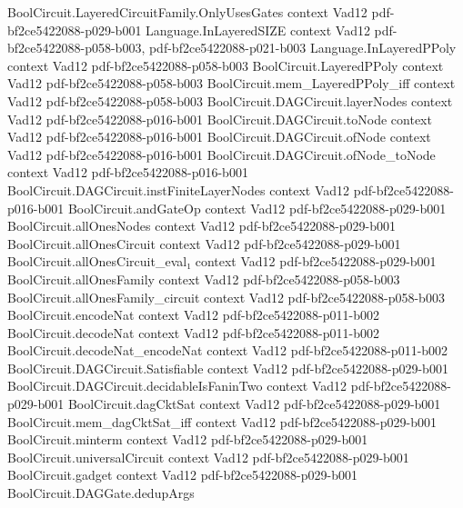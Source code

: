 \begin{theorem}
\proofstep
  {BoolCircuit.LayeredCircuitFamily.OnlyUsesGates}
  {context}
  {Vad12}
  {pdf-bf2ce5422088-p029-b001}
\proofstep
  {Language.InLayeredSIZE}
  {context}
  {Vad12}
  {pdf-bf2ce5422088-p058-b003,
    pdf-bf2ce5422088-p021-b003}
\proofstep
  {Language.InLayeredPPoly}
  {context}
  {Vad12}
  {pdf-bf2ce5422088-p058-b003}
\proofstep
  {BoolCircuit.LayeredPPoly}
  {context}
  {Vad12}
  {pdf-bf2ce5422088-p058-b003}
\proofstep
  {BoolCircuit.mem_LayeredPPoly_iff}
  {context}
  {Vad12}
  {pdf-bf2ce5422088-p058-b003}
\proofstep
  {BoolCircuit.DAGCircuit.layerNodes}
  {context}
  {Vad12}
  {pdf-bf2ce5422088-p016-b001}
\proofstep
  {BoolCircuit.DAGCircuit.toNode}
  {context}
  {Vad12}
  {pdf-bf2ce5422088-p016-b001}
\proofstep
  {BoolCircuit.DAGCircuit.ofNode}
  {context}
  {Vad12}
  {pdf-bf2ce5422088-p016-b001}
\proofstep
  {BoolCircuit.DAGCircuit.ofNode_toNode}
  {context}
  {Vad12}
  {pdf-bf2ce5422088-p016-b001}
\proofstep
  {BoolCircuit.DAGCircuit.instFiniteLayerNodes}
  {context}
  {Vad12}
  {pdf-bf2ce5422088-p016-b001}
\proofstep
  {BoolCircuit.andGateOp}
  {context}
  {Vad12}
  {pdf-bf2ce5422088-p029-b001}
\proofstep
  {BoolCircuit.allOnesNodes}
  {context}
  {Vad12}
  {pdf-bf2ce5422088-p029-b001}
\proofstep
  {BoolCircuit.allOnesCircuit}
  {context}
  {Vad12}
  {pdf-bf2ce5422088-p029-b001}
\proofstep
  {BoolCircuit.allOnesCircuit_eval₁}
  {context}
  {Vad12}
  {pdf-bf2ce5422088-p029-b001}
\proofstep
  {BoolCircuit.allOnesFamily}
  {context}
  {Vad12}
  {pdf-bf2ce5422088-p058-b003}
\proofstep
  {BoolCircuit.allOnesFamily_circuit}
  {context}
  {Vad12}
  {pdf-bf2ce5422088-p058-b003}
\proofstep
  {BoolCircuit.encodeNat}
  {context}
  {Vad12}
  {pdf-bf2ce5422088-p011-b002}
\proofstep
  {BoolCircuit.decodeNat}
  {context}
  {Vad12}
  {pdf-bf2ce5422088-p011-b002}
\proofstep
  {BoolCircuit.decodeNat_encodeNat}
  {context}
  {Vad12}
  {pdf-bf2ce5422088-p011-b002}
\proofstep
  {BoolCircuit.DAGCircuit.Satisfiable}
  {context}
  {Vad12}
  {pdf-bf2ce5422088-p029-b001}
\proofstep
  {BoolCircuit.DAGCircuit.decidableIsFaninTwo}
  {context}
  {Vad12}
  {pdf-bf2ce5422088-p029-b001}
\proofstep
  {BoolCircuit.dagCktSat}
  {context}
  {Vad12}
  {pdf-bf2ce5422088-p029-b001}
\proofstep
  {BoolCircuit.mem_dagCktSat_iff}
  {context}
  {Vad12}
  {pdf-bf2ce5422088-p029-b001}
\proofstep
  {BoolCircuit.minterm}
  {context}
  {Vad12}
  {pdf-bf2ce5422088-p029-b001}
\proofstep
  {BoolCircuit.universalCircuit}
  {context}
  {Vad12}
  {pdf-bf2ce5422088-p029-b001}
\proofstep
  {BoolCircuit.gadget}
  {context}
  {Vad12}
  {pdf-bf2ce5422088-p029-b001}
\proofstep
  {BoolCircuit.DAGGate.dedupArgs}

\end{theorem}
